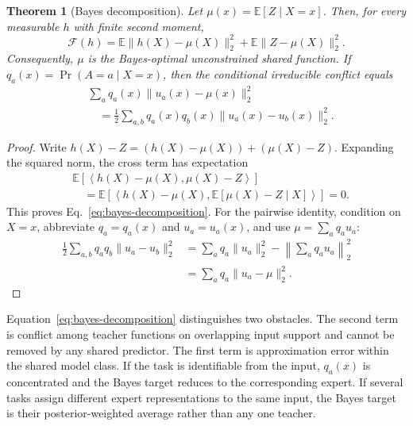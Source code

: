 \documentclass[letterpaper]{article} %
\theoremstyle{plain}
\newtheorem{theorem}{Theorem}
\theoremstyle{definition}
\begin{document}
\begin{theorem}[Bayes decomposition]
\label{thm:bayes}
Let $\mu(x)=\mathbb E[Z\mid X=x]$.
Then, for every measurable $h$ with finite second moment,
\begin{equation}
\mathcal F(h)=
\mathbb E\|h(X)-\mu(X)\|_2^2
+\mathbb E\|Z-\mu(X)\|_2^2.
\label{eq:bayes-decomposition}
\end{equation}
Consequently, $\mu$ is the Bayes-optimal unconstrained shared function.
If $q_a(x)=\Pr(A=a\mid X=x)$, then the conditional irreducible conflict equals
\begin{equation}
\begin{aligned}
&\sum_a q_a(x)\|u_a(x)-\mu(x)\|_2^2 \\
&\quad=\frac12\sum_{a,b}q_a(x)q_b(x)
\|u_a(x)-u_b(x)\|_2^2.
\end{aligned}
\label{eq:pairwise-conflict}
\end{equation}
\end{theorem}

\begin{proof}
Write $h(X)-Z=(h(X)-\mu(X))+(\mu(X)-Z)$.
Expanding the squared norm, the cross term has expectation
\begin{align*}
&\mathbb E\!\left[
\left\langle h(X)-\mu(X),\mu(X)-Z\right\rangle
\right] \\
&\quad=
\mathbb E\!\left[
\left\langle h(X)-\mu(X),
\mathbb E[\mu(X)-Z\mid X]
\right\rangle
\right]=0.
\end{align*}
This proves Eq.~\eqref{eq:bayes-decomposition}.
For the pairwise identity, condition on $X=x$, abbreviate $q_a=q_a(x)$ and $u_a=u_a(x)$, and use $\mu=\sum_aq_au_a$:
\begin{align*}
\frac12\sum_{a,b}q_aq_b\|u_a-u_b\|_2^2
&=\sum_aq_a\|u_a\|_2^2-
\left\|\sum_aq_au_a\right\|_2^2 \\
&=\sum_aq_a\|u_a-\mu\|_2^2.
\end{align*}
\end{proof}

Equation~\eqref{eq:bayes-decomposition} distinguishes two obstacles.
The second term is conflict among teacher functions on overlapping input support and cannot be removed by any shared predictor.
The first term is approximation error within the shared model class.
If the task is identifiable from the input, $q_a(x)$ is concentrated and the Bayes target reduces to the corresponding expert.
If several tasks assign different expert representations to the same input, the Bayes target is their posterior-weighted average rather than any one teacher.
\end{document}
